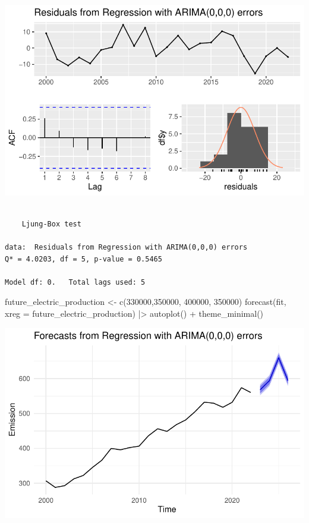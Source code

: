 \documentclass[
  letterpaper,
  DIV=11,
  numbers=noendperiod]{scrartcl}
\newenvironment{Shaded}{\begin{snugshade}}{\end{snugshade}}
\newcommand{\AttributeTok}[1]{\textcolor[rgb]{0.40,0.45,0.13}{#1}}
\newcommand{\DecValTok}[1]{\textcolor[rgb]{0.68,0.00,0.00}{#1}}
\newcommand{\FunctionTok}[1]{\textcolor[rgb]{0.28,0.35,0.67}{#1}}
\newcommand{\NormalTok}[1]{\textcolor[rgb]{0.00,0.23,0.31}{#1}}
\newcommand{\OtherTok}[1]{\textcolor[rgb]{0.00,0.23,0.31}{#1}}
\newcommand{\SpecialCharTok}[1]{\textcolor[rgb]{0.37,0.37,0.37}{#1}}
\begin{document}
\includegraphics{project_files/figure-pdf/unnamed-chunk-28-1.pdf}

\begin{verbatim}

    Ljung-Box test

data:  Residuals from Regression with ARIMA(0,0,0) errors
Q* = 4.0203, df = 5, p-value = 0.5465

Model df: 0.   Total lags used: 5
\end{verbatim}

\begin{Shaded}
\begin{Highlighting}[]
\NormalTok{future\_electric\_production }\OtherTok{\textless{}{-}} \FunctionTok{c}\NormalTok{(}\DecValTok{330000}\NormalTok{,}\DecValTok{350000}\NormalTok{, }\DecValTok{400000}\NormalTok{, }\DecValTok{350000}\NormalTok{)}
\FunctionTok{forecast}\NormalTok{(fit, }\AttributeTok{xreg =}\NormalTok{ future\_electric\_production) }\SpecialCharTok{|\textgreater{}} \FunctionTok{autoplot}\NormalTok{() }\SpecialCharTok{+} \FunctionTok{theme\_minimal}\NormalTok{()}
\end{Highlighting}
\end{Shaded}

\includegraphics{project_files/figure-pdf/unnamed-chunk-28-2.pdf}
\end{document}
